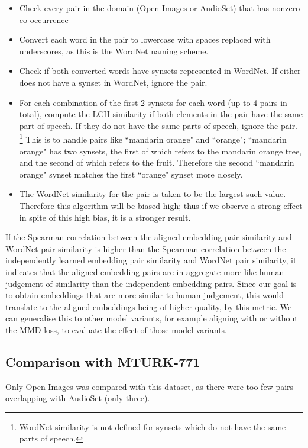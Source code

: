 \begin{itemize}
    \item Check every pair in the domain (Open Images or AudioSet) that has nonzero co-occurrence
    \item Convert each word in the pair to lowercase with spaces replaced with underscores, as this is the WordNet naming scheme.
    \item Check if both converted words have synsets represented in WordNet. If either does not have a synset in WordNet, ignore the pair.
    \item For each combination of the first 2 synsets for each word (up to 4 pairs in total), compute the LCH similarity  if both elements in the pair have the same part of speech. If they do not have the same parts of speech, ignore the pair. \footnote{WordNet similarity is not defined for synsets which do not have the same parts of speech. } This is to handle pairs like ``mandarin orange" and ``orange"; ``mandarin orange" has two synsets, the first of which refers to the mandarin orange tree, and the second of which refers to the fruit. Therefore the second ``mandarin orange" synset matches the first ``orange" synset more closely. 
    \item The WordNet similarity for the pair is taken to be the largest such value. Therefore this algorithm will be biased high; thus if we observe a strong effect in spite of this high bias, it is a stronger result. 
\end{itemize}

If the Spearman correlation between the aligned embedding pair similarity and WordNet pair similarity is higher than the Spearman correlation between the independently learned embedding pair similarity and WordNet pair similarity, it indicates that the aligned embedding pairs are in aggregate more like human judgement of similarity than the independent embedding pairs. Since our goal is to obtain embeddings that are more similar to human judgement, this would translate to the aligned embeddings being of higher quality, by this metric. We can generalise this to other model variants, for example aligning with or without the MMD loss, to evaluate the effect of those model variants. 

\subsection{Comparison with MTURK-771}
Only Open Images was compared with this dataset, as there were too few pairs overlapping with AudioSet (only three). 

